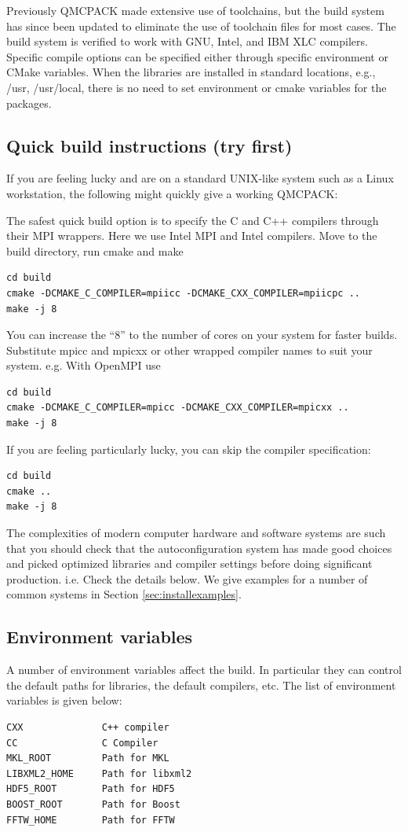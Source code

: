 Previously QMCPACK made extensive use of toolchains, but the build system
has since been updated to eliminate the use of toolchain files for
most cases.  The build system is verified to work with GNU, Intel, and IBM XLC
compilers.  Specific compile options can be specified either through
specific environment or CMake variables.  When the libraries are
installed in standard locations, e.g., /usr, /usr/local, there is no
need to set environment or cmake variables for the packages.

\subsection{Quick build instructions (try first)}
\label{sec:cmakequick}

If you are feeling lucky and are on a standard UNIX-like system such
as a Linux workstation, the following might quickly give a
working QMCPACK:

The safest quick build option is to specify the C and C++ compilers
through their MPI wrappers. Here we use Intel MPI and Intel
compilers. Move to the build directory, run cmake and make
\verbatimfont{\footnotesize}
\begin{verbatim}
cd build
cmake -DCMAKE_C_COMPILER=mpiicc -DCMAKE_CXX_COMPILER=mpiicpc ..
make -j 8
\end{verbatim}
You can increase the ``8'' to the number of cores on your system for
faster builds. Substitute mpicc and mpicxx or other wrapped compiler names to suit
  your system. e.g. With OpenMPI use
\verbatimfont{\footnotesize}
\begin{verbatim}
cd build
cmake -DCMAKE_C_COMPILER=mpicc -DCMAKE_CXX_COMPILER=mpicxx ..
make -j 8
\end{verbatim}

If you are feeling particularly lucky, you can skip the compiler specification:
\verbatimfont{\footnotesize}
\begin{verbatim}
cd build
cmake ..
make -j 8
\end{verbatim}

The complexities of modern computer hardware and software systems are
such that you should check that the autoconfiguration system has made
good choices and picked optimized libraries and compiler settings
before doing significant production. i.e. Check the details below. We
give examples for a number of common systems in Section \ref{sec:installexamples}.

\subsection{Environment variables}
\label{sec:envvar}
A number of environment variables affect the build.  In particular
they can control the default paths for libraries, the default
compilers, etc.  The list of environment variables is given below:
\verbatimfont{\footnotesize}%
\begin{verbatim}
CXX              C++ compiler
CC               C Compiler
MKL_ROOT         Path for MKL
LIBXML2_HOME     Path for libxml2
HDF5_ROOT        Path for HDF5
BOOST_ROOT       Path for Boost
FFTW_HOME        Path for FFTW
\end{verbatim}

